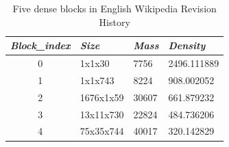\renewcommand{\arraystretch}{1.4}
\begin{table}[!ht]
\centering
\caption{Five dense blocks in English Wikipedia Revision History}
\label{tab:wikipedia}
\begin{tabular}{|c|p{2cm}|p{2cm}|p{3cm}|}
\hline
\textit{\textbf{Block\_index}} & \textit{\textbf{Size}} & \textit{\textbf{Mass}} & \textit{\textbf{Density}} \\ \hline
{0}                     & 1x1x30                 & 7756                               & 2496.111889                           \\ \hline
{1}                     & 1x1x743                 & 8224                               & 908.002052                           \\ \hline
{2}                     & 1676x1x59                 & 30607                               & 661.879232                          \\ \hline
{3}                     & 13x11x730                  & 22824                                & 484.736206                           \\ \hline
{4}                     & 75x35x744                 & 40017                               & 320.142829                           \\ \hline
\end{tabular}
\end{table}

